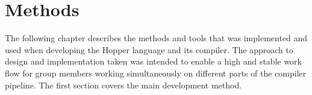 \chapter{Methods}



The following chapter describes the methods and tools that was implemented and used when developing the Hopper language and its compiler. The approach to design and implementation taken was intended to enable a high and stable work flow for group members working simultaneously on different parts of the compiler pipeline. The first section covers the main development method.





%
